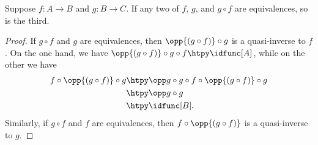 %
\begin{thm}\label{thm:two-out-of-three}
  Suppose $f:A\to B$ and $g:B\to C$.
  If any two of $f$, $g$, and $g\circ f$ are equivalences, so is the third.
\end{thm}

\begin{proof}
  If $g\circ f$ and $g$ are equivalences, then $\opp{(g\circ f)} \circ g$ is a quasi-inverse to $f$.
  On the one hand, we have $\opp{(g\circ f)} \circ g \circ f \htpy \idfunc[A]$, while on the other we have
  \begin{align*}
    f \circ \opp{(g\circ f)} \circ g
    &\htpy \opp g \circ g \circ f \circ \opp{(g\circ f)} \circ g\\
    &\htpy \opp g \circ g\\
    &\htpy \idfunc[B].
  \end{align*}
  Similarly, if $g\circ f$ and $f$ are equivalences, then $f\circ \opp{(g\circ f)}$ is a quasi-inverse to $g$.
\end{proof}
